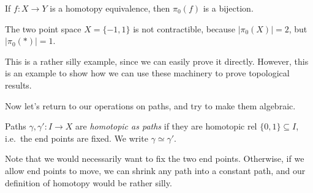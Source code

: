 \documentclass[a4paper]{article}
\begin{document}
\begin{cor}
  If $f: X\to Y$ is a homotopy equivalence, then $\pi_0(f)$ is a bijection.
\end{cor}

\begin{eg}
  The two point space $X = \{-1, 1\}$ is not contractible, because $|\pi_0(X)| = 2$, but $|\pi_0(*)| = 1$.
\end{eg}
This is a rather silly example, since we can easily prove it directly. However, this is an example to show how we can use these machinery to prove topological results.

Now let's return to our operations on paths, and try to make them algebraic.

\begin{defi}
  Paths $\gamma, \gamma': I\to X$ are \emph{homotopic as paths} if they are homotopic rel $\{0, 1\}\subseteq I$, i.e.\ the end points are fixed. We write $\gamma\simeq \gamma'$.
\end{defi}
\begin{center}
\end{center}
Note that we would necessarily want to fix the two end points. Otherwise, if we allow end points to move, we can shrink any path into a constant path, and our definition of homotopy would be rather silly.
\end{document}
